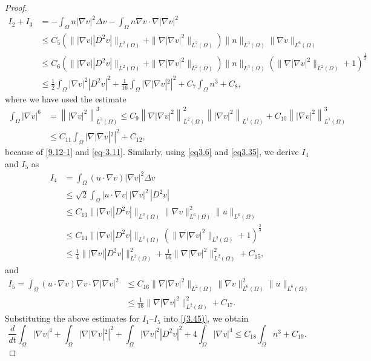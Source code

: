 \documentclass[reqno]{amsart}
\begin{document}
\begin{proof}
\begin{align*}
I_2 + I_3 &=- \int_{\Omega} n |\nabla v|^2 \Delta v
  - \int_{\Omega} n \nabla v \cdot \nabla |\nabla v|^2\\
&\leq C_5\left(\||\nabla v| |D^2 v|\|_{L^2(\Omega)}+\|\nabla|\nabla v|^2\|_{L^2(\Omega)}\right)\|n\|_{L^3(\Omega)}\|\nabla v\|_{L^6(\Omega)}\\
&\leq C_6\left(\||\nabla v| |D^2 v|\|_{L^2(\Omega)}+\|\nabla|\nabla v|^2\|_{L^2(\Omega)}\right)\|n\|_{L^3(\Omega)}\left(\|\nabla|\nabla v|^2\|_{L^2(\Omega)}+1\right)^{\frac{1}{3}}
\\
&\leq \frac{1}{2} \int_{\Omega} |\nabla v|^2 |D^2 v|^2 +\frac{1}{16}\int_{\Omega} |\nabla |\nabla v|^2|^2  + C_7 \int_{\Omega} n^3+C_8,
\end{align*}
where we have used the estimate
\begin{equation}\label{eq3.35}
\begin{aligned}
\int_{\Omega} |\nabla v|^6 &= \left\| |\nabla v|^2 \right\|_{L^3(\Omega)}^3 
\leq C_{9} \left\| \nabla |\nabla v|^2 \right\|_{L^2(\Omega)}^2 \left\| |\nabla v|^2
\right\|_{L^1(\Omega)} + C_{10} \left\| |\nabla v|^2 \right\|_{L^1(\Omega)}^3 \\
&\leq C_{11} \int_{\Omega} |\nabla |\nabla v|^2|^2 + C_{12},
\end{aligned}
\end{equation}
because of \eqref{9.12-1} and \eqref{eq-3.11}. 
Similarly, using \eqref{eq3.6} and \eqref{eq3.35}, we derive $I_4$ and $I_5$ as
\begin{align*}
I_4 &= \int_{\Omega} (u \cdot \nabla v) |\nabla v|^2 \Delta v\\
&\leq \sqrt{2} \int_{\Omega} |u \cdot \nabla v| \, |\nabla v|^2 \, |D^2 v| \\
&\leq C_{13} \||\nabla v| |D^2 v|\|_{L^2(\Omega)}\|\nabla v\|^2_{L^6(\Omega)}\|u\|_{L^6(\Omega)}\\
&\leq C_{14} \||\nabla v| |D^2 v|\|_{L^2(\Omega)}\left(\|\nabla|\nabla v|^2\|_{L^2(\Omega)}+1\right)^{\frac{2}{3}}\\
&\leq \frac{1}{4} \||\nabla v|  |D^2 v|\|_{L^2(\Omega)}^2 + \frac{1}{16}\| \nabla |\nabla v|^2 \|_{L^2(\Omega)}^2 + C_{15},
\end{align*}
and
\begin{align*}
I_5 = \int_{\Omega} (u \cdot \nabla v) \nabla v \cdot \nabla|\nabla v|^2
&\leq C_{16}\|\nabla|\nabla v|^2\|_{L^2(\Omega)}\|\nabla v\|_{L^6(\Omega)}^2\|u\|_{L^6(\Omega)} \\
&\leq \frac{1}{16} \|\nabla|\nabla v|^2\|_{L^2(\Omega)}^2+ C_{17}.
\end{align*}
Substituting the above estimates for $I_1$--$I_5$ into \eqref{(3.45)}, we obtain
\begin{equation}\label{(3.48)}
\frac{d}{dt} \int_{\Omega} |\nabla v|^4
+  \int_{\Omega} |\nabla |\nabla v|^2|^2
+ \int_{\Omega} |\nabla v|^2 |D^2 v|^2
+ 4\int_{\Omega} |\nabla v|^4\leq  C_{18} \int_{\Omega} n^3 +C_{19}.
\end{equation}


\end{proof}
\end{document}
